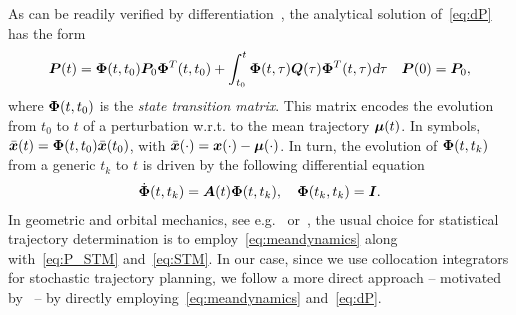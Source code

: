 As can be readily verified by differentiation~\cite{Gajic:LyapunovMatrixEquation:2010}, the analytical solution of~\eqref{eq:dP} has the form
\begin{align}\label{eq:P_STM}
\bP(t) = \bPhi(t,t_0) \bP_0 \bPhi^T(t,t_0)+\int_{t_0}^{t} \bPhi(t,\tau) \bQ(\tau) \bPhi^T(t,\tau) \dd \tau \quad \bP(0)=\bP_0,
\end{align}
where $\boldsymbol{\Phi}(t,t_0)$ is the \emph{state transition matrix}. This matrix encodes the evolution from $t_0$ to $t$ of a perturbation w.r.t. to the mean trajectory $\boldsymbol{\mu}(t)$. In symbols, $\bar{\boldsymbol{x}}(t) = \boldsymbol{\Phi}(t,t_0) \bar{\boldsymbol{x}}(t_0)$, with $\bar{\boldsymbol{x}}(\cdot) =\boldsymbol{x}(\cdot) - \boldsymbol{\mu}(\cdot) $. In turn, the evolution of $\boldsymbol{\Phi}(t,t_k)$ from a generic $t_k$ to $t$ is driven by the following differential equation
\begin{align}\label{eq:STM}
\dbPhi(t,t_k) = \bA(t)\bPhi(t,t_k), \quad \bPhi(t_k, t_k) = \bI.
\end{align}
In geometric and orbital mechanics, see e.g.~\cite{Maruskin:DynamicalSystemsGeometric:2018} or~\cite{Tapley:StatisticalOrbitDetermination:2004}, the usual choice for statistical trajectory determination is to employ~\eqref{eq:meandynamics} along with~\eqref{eq:P_STM} and~\eqref{eq:STM}. In our case, since we use collocation integrators for stochastic trajectory planning, we follow a more direct approach -- motivated by~\cite{Gillis:PracticalMethodsApproximate:2015} -- by directly employing~\eqref{eq:meandynamics} and~\eqref{eq:dP}.

